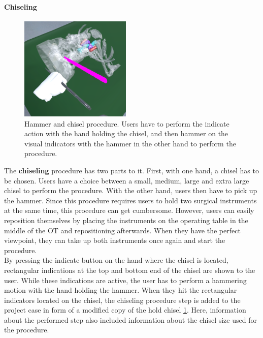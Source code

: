 \paragraph{Chiseling}

\begin{figure}[ht]
    \centering
    \includegraphics[width=200px]{images/implementation/features/procedures/chisel.png}
    \caption{\label{fig::FeatureChisel}Hammer and chisel procedure. Users have to perform the indicate action with the hand holding the chisel, and then hammer on the visual indicators with the hammer in the other hand to perform the procedure.}
\end{figure}

The \textbf{chiseling} procedure has two parts to it.
First, with one hand, a chisel has to be chosen.
Users have a choice between a small, medium, large and extra large chisel to perform the procedure.
With the other hand, users then have to pick up the hammer.
Since this procedure requires users to hold two surgical instruments at the same time, this procedure can get cumbersome.
However, users can easily reposition themselves by placing the instruments on the operating table in the middle of the OT and repositioning afterwards.
When they have the perfect viewpoint, they can take up both instruments once again and start the procedure.
\\ By pressing the indicate button on the hand where the chisel is located, rectangular indications at the top and bottom end of the chisel are shown to the user.
While these indications are active, the user has to perform a hammering motion with the hand holding the hammer.
When they hit the rectangular indicators located on the chisel, the chiseling procedure step is added to the project case in form of a modified copy of the hold chisel \ref{fig::FeatureChisel}.
Here, information about the performed step also included information about the chisel size used for the procedure. 